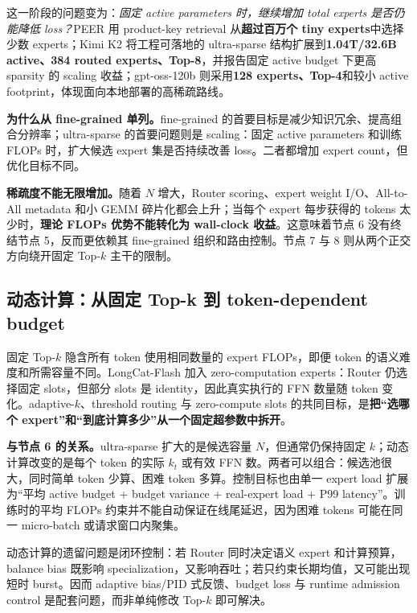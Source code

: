 \documentclass[10pt,a4paper,fontset=none]{ctexart}
\newcommand{\term}[1]{\textbf{#1}}
\begin{document}
这一阶段的问题变为：\emph{固定 active parameters 时，继续增加 total experts 是否仍能降低 loss？}PEER 用 product-key retrieval 从\textbf{超过百万个 tiny experts}中选择少数 experts\cite{zh:he2024peer}；Kimi K2 将工程可落地的 ultra-sparse 结构扩展到\textbf{1.04T/32.6B active、384 routed experts、Top-8}，并报告固定 active budget 下更高 sparsity 的 scaling 收益\cite{zh:kimiK2}；gpt-oss-120b 则采用\textbf{128 experts、Top-4}和较小 active footprint，体现面向本地部署的高稀疏路线\cite{zh:openaiGptOss}。

\textbf{为什么从 fine-grained 单列。}fine-grained 的首要目标是减少知识冗余、提高组合分辨率；ultra-sparse 的首要问题则是 scaling：固定 active parameters 和训练 FLOPs 时，扩大候选 expert 集是否持续改善 loss。二者都增加 expert count，但优化目标不同。

\term{稀疏度不能无限增加。}随着 $N$ 增大，Router scoring、expert weight I/O、All-to-All metadata 和小 GEMM 碎片化都会上升；当每个 expert 每步获得的 tokens 太少时，\textbf{理论 FLOPs 优势不能转化为 wall-clock 收益}。这意味着节点 6 没有终结节点 5，反而更依赖其 fine-grained 组织和路由控制。节点 7 与 8 则从两个正交方向绕开固定 Top-$k$ 主干的限制。

\subsection{动态计算：从固定 Top-k 到 token-dependent budget}

固定 Top-$k$ 隐含所有 token 使用相同数量的 expert FLOPs，即便 token 的语义难度和所需容量不同。LongCat-Flash 加入 zero-computation experts：Router 仍选择固定 slots，但部分 slots 是 identity，因此真实执行的 FFN 数量随 token 变化\cite{zh:longcatFlash}。adaptive-$k$、threshold routing 与 zero-compute slots 的共同目标，是\term{把“选哪个 expert”和“到底计算多少”从一个固定超参数中拆开}。

\textbf{与节点 6 的关系。}ultra-sparse 扩大的是候选容量 $N$，但通常仍保持固定 $k$；动态计算改变的是每个 token 的实际 $k_t$ 或有效 FFN 数。两者可以组合：候选池很大，同时简单 token 少算、困难 token 多算。控制目标也由单一 expert load 扩展为“平均 active budget + budget variance + real-expert load + P99 latency”。训练时的平均 FLOPs 约束并不能自动保证在线尾延迟，因为困难 tokens 可能在同一 micro-batch 或请求窗口内聚集。

动态计算的遗留问题是闭环控制：若 Router 同时决定语义 expert 和计算预算，balance bias 既影响 specialization，又影响吞吐；若只约束长期均值，又可能出现短时 burst。因而 adaptive bias/PID 式反馈、budget loss 与 runtime admission control 是配套问题，而非单纯修改 Top-$k$ 即可解决。
\end{document}
